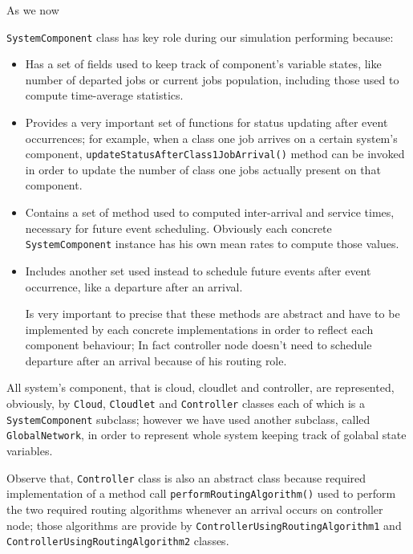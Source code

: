 \documentclass[10pt,a4paper]{article}
\begin{document}
As we now 

\texttt{SystemComponent} class has key role during our simulation performing because:
\begin{itemize}

\item Has a set of fields used to keep track of component's variable states, like number of departed jobs or current jobs population, including those used to compute time-average statistics.

\item Provides a very important set of functions for status updating after event occurrences; for example, when a class one job arrives on a certain system's component, \texttt{updateStatusAfterClass1JobArrival()} method can be invoked in order to update the number of class one jobs actually present on that component.

\item Contains a set of method used to computed inter-arrival and service times, necessary for future event scheduling. Obviously each concrete \texttt{SystemComponent} instance has his own mean rates to compute those values.

\item Includes another set used instead to schedule future events after event occurrence, like a departure after an arrival. 

Is very important to precise that these methods are abstract and have to be implemented by each concrete implementations in order to reflect each component behaviour; In fact controller node doesn't need to schedule departure after an arrival because of his routing role.
\end{itemize}

All system's component, that is cloud, cloudlet and controller, are represented, obviously, by \texttt{Cloud}, \texttt{Cloudlet} and \texttt{Controller} classes each of which is a \texttt{SystemComponent} subclass; however we have used another subclass, called \texttt{GlobalNetwork}, in order to represent whole system keeping track of golabal state variables.

Observe that, \texttt{Controller} class is also an abstract class because required implementation of a method call \texttt{performRoutingAlgorithm()} used to perform the two required routing algorithms whenever an arrival occurs on controller node; those algorithms are provide by \texttt{ControllerUsingRoutingAlgorithm1} and \texttt{ControllerUsingRoutingAlgorithm2} classes. 
\end{document}
